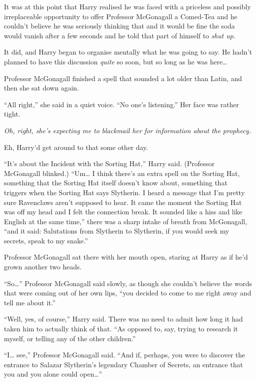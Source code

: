 It was at this point that Harry realised he was faced with a priceless
and possibly irreplaceable opportunity to offer Professor McGonagall a
Comed-Tea and he couldn't believe he was seriously thinking that and it
would be fine the soda would vanish after a few seconds and he told that
part of himself to \emph{shut up.}

It did, and Harry began to organise mentally what he was going to say.
He hadn't planned to have this discussion \emph{quite} so soon, but so
long as he was here\ldots{}

Professor McGonagall finished a spell that sounded a lot older than
Latin, and then she sat down again.

``All right,'' she said in a quiet voice. ``No one's listening.'' Her
face was rather tight.

\emph{Oh, right, she's expecting me to blackmail her for information
about the prophecy.}

Eh, Harry'd get around to that some other day.

``It's about the Incident with the Sorting Hat,'' Harry said. (Professor
McGonagall blinked.) ``Um\ldots{} I think there's an extra spell on the
Sorting Hat, something that the Sorting Hat itself doesn't know about,
something that triggers when the Sorting Hat says Slytherin. I heard a
message that I'm pretty sure Ravenclaws aren't supposed to hear. It came
the moment the Sorting Hat was off my head and I felt the connection
break. It sounded like a hiss and like English at the same time,'' there
was a sharp intake of breath from McGonagall, ``and it said: Salutations
from Slytherin to Slytherin, if you would seek my secrets, speak to my
snake.''

Professor McGonagall sat there with her mouth open, staring at Harry as
if he'd grown another two heads.

``So\ldots{}'' Professor McGonagall said slowly, as though she couldn't
believe the words that were coming out of her own lips, ``you decided to
come to me right away and tell me about it.''

``Well, yes, of course,'' Harry said. There was no need to admit how
long it had taken him to actually think of that. ``As opposed to, say,
trying to research it myself, or telling any of the other children.''

``I\ldots{} see,'' Professor McGonagall said. ``And if, perhaps, you
were to discover the entrance to Salazar Slytherin's legendary Chamber
of Secrets, an entrance that you and you alone could open\ldots{}''


